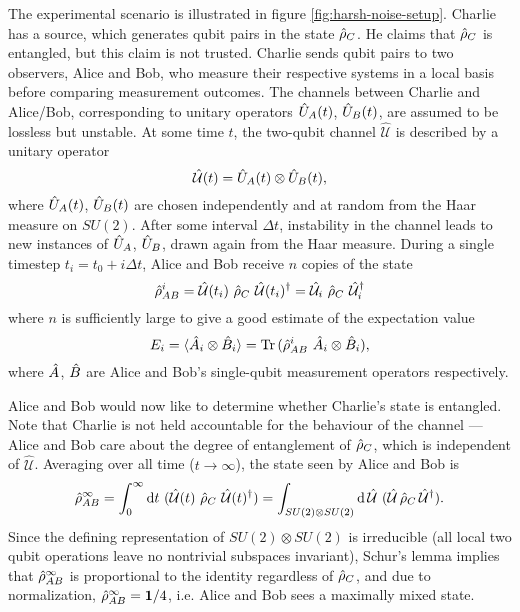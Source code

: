 \newcommand{\fullchannel}{\hat{\mathcal{U}}}
The experimental scenario is illustrated in figure \ref{fig:harsh-noise-setup}.
Charlie has a source, which generates qubit pairs in the state $\hat{\rho}_C$. He claims that $\hat{\rho}_C$ is entangled, but this claim is not trusted. Charlie sends qubit pairs to two observers, Alice and Bob, who measure their respective systems in a local basis before comparing measurement outcomes. The channels between Charlie and Alice/Bob, corresponding to unitary operators $\hat{U}_A(t)$, $\hat{U}_B(t)$, are assumed to be lossless but unstable. At some time $t$, the two-qubit channel $\fullchannel$ is described by a unitary operator 
\begin{equation}
    \fullchannel(t) = \unitary_A(t) \otimes \unitary_B(t),
\end{equation}
where $\hat{U}_A(t)$, $\hat{U}_B(t)$ are chosen independently and at random from the Haar measure on $SU(2)$. After some interval $\Delta t$, instability in the channel leads to new instances of $\hat{U}_A$, $\hat{U}_B$, drawn again from the Haar measure. During a single timestep $t_i = t_0 + i \Delta t$, Alice and Bob receive $n$ copies of the state
\begin{equation}
   \bstate^i = \fullchannel(t_i) ~ \astate ~ \fullchannel(t_i)^\dagger = \fullchannel_i ~ \astate ~ \fullchannel_i^\dagger 
\end{equation}
where $n$ is sufficiently large to give a good estimate of the expectation value
\begin{equation}
  E_i = \langle \hat{A}_i \otimes \hat{B}_i  \rangle = \text{Tr}\, ( \hat{\rho}_{AB}^i ~ \hat{A}_i \otimes \hat{B}_i ),
\end{equation}
where $\hat{A}$, $\hat{B}$ are Alice and Bob's single-qubit measurement operators  respectively.

Alice and Bob would now like to determine whether Charlie's state is entangled. Note that Charlie is not held accountable for the behaviour of the channel --- Alice and Bob care about the degree of entanglement of $\hat{\rho}_C$, which is independent of $\fullchannel$.
Averaging over all time ($t \rightarrow \infty$),  the state seen by Alice and Bob is 
\begin{equation}
    \bstate^\infty = 
   \int_0^\infty \text{d}t ~ (\fullchannel(t) ~\astate ~\fullchannel(t) ^\dagger) =
   \int_{SU(2)\otimes SU(2)} \text{d} \, \fullchannel ~ (\fullchannel \, \astate \, \fullchannel ^\dagger).
\end{equation}
Since the defining representation of $SU(2)\otimes SU(2)$ is irreducible (all local two qubit operations leave no nontrivial subspaces invariant), Schur's lemma implies that $\hat{\rho}_{AB}^\infty$ is proportional to the identity regardless of $\hat{\rho}_C$, and due to normalization, $\hat{\rho}_{AB}^\infty=\mathbf{1}/4$, i.e. Alice and Bob sees a maximally mixed state. 

